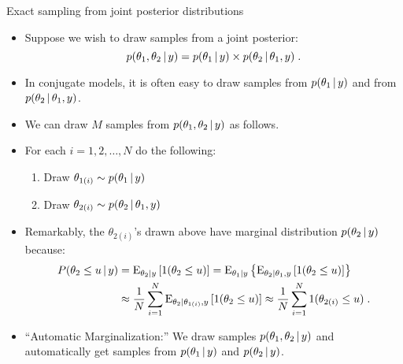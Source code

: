 \begin{frame}{Exact sampling from joint posterior distributions}

\begin{itemize}\setlength{\itemsep}{0cm}
\item \vskip-4mm Suppose we wish to draw samples from a joint posterior:
\[
 p(\theta_1,\theta_2\,|\, y) = p(\theta_1\,|\, y) \times p(\theta_2\,|\, \theta_1, y)\; .
\]

\item In conjugate models, it is often easy to draw samples from $p(\theta_1\,|\, y)$ and from $p(\theta_2\,|\, \theta_1,y)$. 

\item We can draw $M$ samples from $p(\theta_1,\theta_2\,|\, y)$ as follows.

\item For each $i=1,2,\ldots,N$ do the following: 
 \begin{enumerate}\setlength{\itemsep}{0cm}
  \item Draw $\displaystyle \theta_{1(i)} \sim p(\theta_1\,|\, y)$
  \item Draw $\displaystyle \theta_{2(i)} \sim p(\theta_2\,|\, \theta_1,y)$
 \end{enumerate}

\item Remarkably, the $\theta_{2(i)}$'s drawn above have marginal distribution $p(\theta_2\,|\, y)$ because: 
\vskip -9mm \begin{align*} P(\theta_2\leq u \,|\, y) &= \mbox{E}_{\theta_2|y}\left[1(\theta_2\leq u)\right] = \mbox{E}_{\theta_1|y}\left\{\mbox{E}_{\theta_2|\theta_1, y}\left[1(\theta_2\leq u)\right]\right\} \\
  &\approx \frac{1}{N} \sum_{i=1}^N \mbox{E}_{\theta_2|\theta_{1(i)}, y}\left[1(\theta_2\leq u)\right] \approx  \frac{1}{N} \sum_{i=1}^N 1(\theta_{2(i)}\leq u)\; .
\end{align*}

\item ``Automatic Marginalization:'' We draw samples $p(\theta_1,\theta_2\,|\, y)$ and automatically get samples from $p(\theta_1\,|\, y)$ and $p(\theta_2\,|\, y)$.

\end{itemize}

\end{frame}

